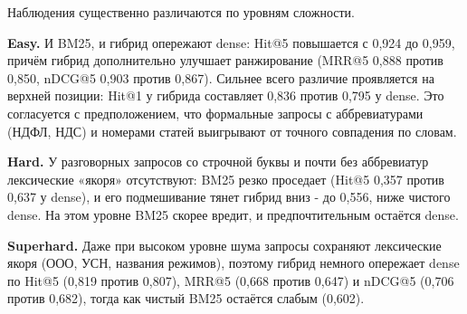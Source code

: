 \documentclass[a4paper,12pt]{article}
\begin{document}
\begin{table}[H]
\centering
\caption{Сравнение dense / BM25 / hybrid (RRF) при $k=5$, без реранкера}
\label{tab:hybrid_results}
\end{table}
\FloatBarrier

Наблюдения существенно различаются по уровням сложности.

\textbf{Easy.} И BM25, и гибрид опережают dense: Hit@5 повышается с 0,924 до 0,959, причём гибрид дополнительно улучшает ранжирование (MRR@5 0,888 против 0,850, nDCG@5 0,903 против 0,867). Сильнее всего различие проявляется на верхней позиции: Hit@1 у гибрида составляет 0,836 против 0,795 у dense. Это согласуется с предположением, что формальные запросы с аббревиатурами (НДФЛ, НДС) и номерами статей выигрывают от точного совпадения по словам.

\textbf{Hard.} У разговорных запросов со строчной буквы и почти без аббревиатур лексические «якоря» отсутствуют: BM25 резко проседает (Hit@5 0,357 против 0,637 у dense), и его подмешивание тянет гибрид вниз - до 0,556, ниже чистого dense. На этом уровне BM25 скорее вредит, и предпочтительным остаётся dense.

\textbf{Superhard.} Даже при высоком уровне шума запросы сохраняют лексические якоря (ООО, УСН, названия режимов), поэтому гибрид немного опережает dense по Hit@5 (0,819 против 0,807), MRR@5 (0,668 против 0,647) и nDCG@5 (0,706 против 0,682), тогда как чистый BM25 остаётся слабым (0,602).
\end{document}
